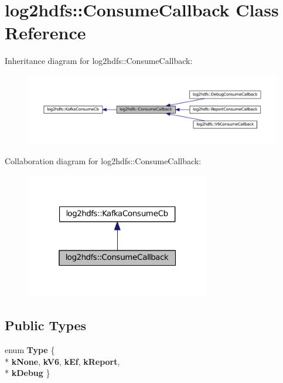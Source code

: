 \hypertarget{classlog2hdfs_1_1ConsumeCallback}{}\section{log2hdfs\+:\+:Consume\+Callback Class Reference}
\label{classlog2hdfs_1_1ConsumeCallback}


Inheritance diagram for log2hdfs\+:\+:Consume\+Callback\+:
\nopagebreak
\begin{figure}[H]
\begin{center}
\leavevmode
\includegraphics[width=350pt]{classlog2hdfs_1_1ConsumeCallback__inherit__graph}
\end{center}
\end{figure}


Collaboration diagram for log2hdfs\+:\+:Consume\+Callback\+:
\nopagebreak
\begin{figure}[H]
\begin{center}
\leavevmode
\includegraphics[width=229pt]{classlog2hdfs_1_1ConsumeCallback__coll__graph}
\end{center}
\end{figure}
\subsection*{Public Types}
\begin{DoxyCompactItemize}
\item 
enum {\bfseries Type} \{ \\*
{\bfseries k\+None}, 
{\bfseries k\+V6}, 
{\bfseries k\+Ef}, 
{\bfseries k\+Report}, 
\\*
{\bfseries k\+Debug}
 \}\hypertarget{classlog2hdfs_1_1ConsumeCallback_a039be9af75b6d19dc0221dc869008bc0}{}\label{classlog2hdfs_1_1ConsumeCallback_a039be9af75b6d19dc0221dc869008bc0}

\end{DoxyCompactItemize}
